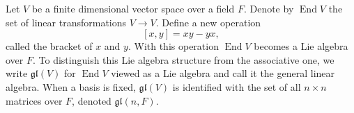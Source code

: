 Let $V$ be a finite dimensional vector space over a field $F$. Denote by $\operatorname{End} V$ the set of linear transformations $V \rightarrow V$. Define a new operation
$$[x, y] = xy - yx,$$
called the bracket of $x$ and $y$. With this operation $\operatorname{End} V$ becomes a Lie algebra over $F$. To distinguish this Lie algebra structure from the associative one, we write $\mathfrak{gl}(V)$ for $\operatorname{End} V$ viewed as a Lie algebra and call it the general linear algebra. When a basis is fixed, $\mathfrak{gl}(V)$ is identified with the set of all $n \times n$ matrices over $F$, denoted $\mathfrak{gl}(n, F)$.
